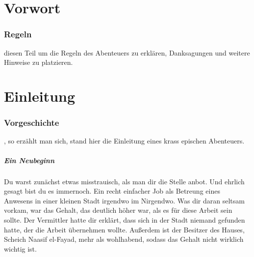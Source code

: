 
\chapter*{Vorwort}

\subsection{Regeln}

 diesen Teil um die Regeln des Abenteuers zu erklären, Danksagungen und weitere Hinweise zu platzieren.

\chapter*{Einleitung}

\subsection{Vorgeschichte}

, so erzählt man sich, stand hier die Einleitung eines krass epischen Abenteuers.

\paragraph{Ein Neubeginn}

Du warst zunächst etwas misstrauisch, als man dir die Stelle anbot.
Und ehrlich gesagt bist du es immernoch.
Ein recht einfacher Job als Betreung eines Anwesens in einer kleinen Stadt irgendwo im Nirgendwo.
Was dir daran seltsam vorkam, war das Gehalt, das deutlich höher war, als es für diese Arbeit sein sollte.
Der Vermittler hatte dir erklärt, dass sich in der Stadt niemand gefunden hatte, der die Arbeit übernehmen wollte.
Außerdem ist der Besitzer des Hauses, Scheich Naasif el-Fayad, mehr als wohlhabend, sodass das Gehalt nicht wirklich wichtig ist.